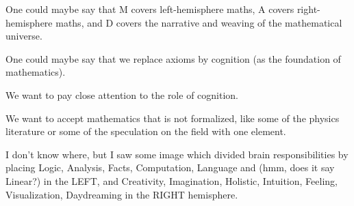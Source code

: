 One could maybe say that M covers left-hemisphere maths, A covers right-hemisphere maths, and D covers the narrative and weaving of the mathematical universe.

One could maybe say that we replace axioms by cognition (as the foundation of mathematics).

We want to pay close attention to the role of cognition.

We want to accept mathematics that is not formalized, like some of the physics literature or some of the speculation on the field with one element.

I don't know where, but I saw some image which divided brain responsibilities by placing Logic, Analysis, Facts, Computation, Language and (hmm, does it say Linear?) in the LEFT, and Creativity, Imagination, Holistic, Intuition, Feeling, Visualization, Daydreaming in the RIGHT hemisphere.
